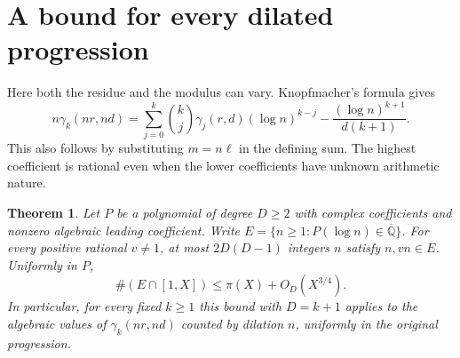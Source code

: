 \documentclass[11pt,a4paper,oneside,openany]{report}
\newtheorem{theorem}{Theorem}[section]
\theoremstyle{remark}\newtheorem{remark}[theorem]{Remark}
\numberwithin{equation}{section}
\begin{document}
\section{A bound for every dilated progression}\label{ch6:sec:ratio}
Here both the residue and the modulus can vary. Knopfmacher's formula \cite[Prop.~3.1]{knop} gives
\begin{equation}\label{ch6:scale}
 n\gamma_k(nr,nd)=\sum_{j=0}^k\binom kj\gamma_j(r,d)(\log n)^{k-j}
 -\frac{(\log n)^{k+1}}{d(k+1)} .
\end{equation}
This also follows by substituting $m=n\ell$ in the defining sum. The highest coefficient is rational even when the lower coefficients have unknown arithmetic nature.

\begin{theorem}\label{ch6:thm:ratio}
Let $P$ be a polynomial of degree $D\ge2$ with complex coefficients and nonzero algebraic leading coefficient. Write $E=\{n\ge1:P(\log n)\in\overline{\mathbb Q}\}$. For every positive rational $v\ne1$, at most $2D(D-1)$ integers $n$ satisfy $n,vn\in E$. Uniformly in $P$,
\[
                 \#(E\cap[1,X])\le\pi(X)+O_D(X^{3/4}).
\]
In particular, for every fixed $k\ge1$ this bound with $D=k+1$ applies to the algebraic values of $\gamma_k(nr,nd)$ counted by dilation $n$, uniformly in the original progression.
\end{theorem}
\end{document}
